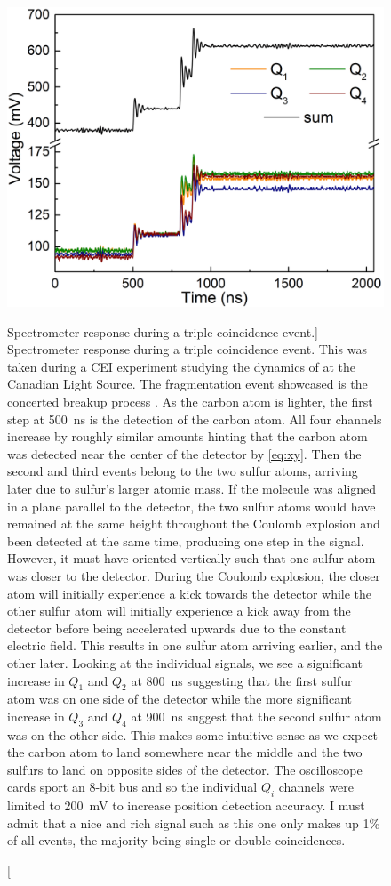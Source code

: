 \begin{figure}
  \centering
  \includegraphics[width=\textwidth]{gfx/TripleCoincidenceEvent}
  \caption
  [Spectrometer response during a triple coincidence event.]
  {Spectrometer response during a triple coincidence event. This was taken during a CEI experiment studying the dynamics of  at the Canadian Light Source. The fragmentation event showcased is the concerted breakup process . As the carbon atom is lighter, the first step at \SI{500}{\ns} is the detection of the carbon atom. All four channels increase by roughly similar amounts hinting that the carbon atom was detected near the center of the detector by \eqref{eq:xy}. Then the second and third events belong to the two sulfur atoms, arriving later due to sulfur's larger atomic mass. If the molecule was aligned in a plane parallel to the detector, the two sulfur atoms would have remained at the same height throughout the Coulomb explosion and been detected at the same time, producing one step in the signal. However, it must have oriented vertically such that one sulfur atom was closer to the detector. During the Coulomb explosion, the closer atom will initially experience a kick towards the detector while the other sulfur atom will initially experience a kick away from the detector before being accelerated upwards due to the constant electric field. This results in one sulfur atom arriving earlier, and the other later. Looking at the individual signals, we see a significant increase in $Q_1$ and $Q_2$ at \SI{800}{\ns} suggesting that the first sulfur atom was on one side of the detector while the more significant increase in $Q_3$ and $Q_4$ at \SI{900}{\ns} suggest that the second sulfur atom was on the other side. This makes some intuitive sense as we expect the carbon atom to land somewhere near the middle and the two sulfurs to land on opposite sides of the detector. The oscilloscope cards sport an 8-bit bus and so the individual $Q_i$ channels were limited to \SI{200}{\mV} to increase position detection accuracy. I must admit that a nice and rich signal such as this one only makes up 1\% of all events, the majority being single or double coincidences.}
  \label{fig:tripleCoincidence}
\end{figure}

